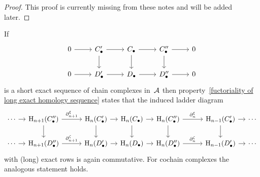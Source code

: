 \begin{proof}
  This proof is currently missing from these notes and will be added later.
\end{proof}


\begin{remark*}
  If
  \[
    \begin{tikzcd}
        0
        \arrow{r}
      & \Ccc'
        \arrow{r}
        \arrow{d}
      & \Ccc
        \arrow{r}
        \arrow{d}
      & \Ccc''
        \arrow{r}
        \arrow{d}
      & 0
      \\
        0
        \arrow{r}
      & \Dcc'
        \arrow{r}
      & \Dcc
        \arrow{r}
      & \Dcc''
        \arrow{r}
      & 0
    \end{tikzcd}
  \]
  is a short exact sequence of chain complexes in~$\mathcal{A}$ then property~\ref*{fuctoriality of long exact homology sequence} states that the induced ladder diagram
  \[
    \begin{tikzcd}[column sep = 1em]
        \dotsb
        \arrow{r}
      & \Hl_{n+1}(\Ccc'')
        \arrow{rr}[above]{\del_{n+1}^\xi}
        \arrow{d}
      & {}
      & \Hl_{n}(\Ccc')
        \arrow{r}
        \arrow{d}
      & \Hl_{n}(\Ccc)
        \arrow{r}
        \arrow{d}
      & \Hl_{n}(\Ccc'')
        \arrow{rr}[above]{\del_n^\xi}
        \arrow{d}
      & {}
      & \Hl_{n-1}(\Ccc')
        \arrow{r}
        \arrow{d}
      & \dotsb
      \\
        \dotsb
        \arrow{r}
      & \Hl_{n+1}(\Dcc'')
        \arrow{rr}[above]{\del_{n+1}^\zeta}
      & {}
      & \Hl_{n}(\Dcc')
        \arrow{r}
      & \Hl_{n}(\Dcc)
        \arrow{r}
      & \Hl_{n}(\Dcc'')
        \arrow{rr}[above]{\del_n^\zeta}
      & {}
      & \Hl_{n-1}(\Dcc')
        \arrow{r}
      & \dotsb
    \end{tikzcd}
  \]
  with (long) exact rows is again commutative.
  For cochain complexes the analogous statement holds.
\end{remark*}


